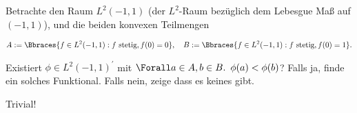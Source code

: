 \begin{exercise}

Betrachte den Raum $L^2(-1, 1)$ (der $L^2$-Raum bezüglich dem Lebesgue Maß auf $(-1, 1)$), und die beiden konvexen Teilmengen

\begin{align*}
  A := \Bbraces{f \in L^2(-1, 1): f \text{ stetig}, f(0) = 0},
  \quad
  B := \Bbraces{f \in L^2(-1, 1): f \text{ stetig}, f(0) = 1}.
\end{align*}

Existiert $\phi \in L^2(-1, 1)^\prime$ mit $\Forall a \in A, b \in B. \enspace \phi(a) < \phi(b)$?
Falls ja, finde ein solches Funktional.
Falls nein, zeige dass es keines gibt.

\end{exercise}

\begin{solution}

Trivial!

\end{solution}
